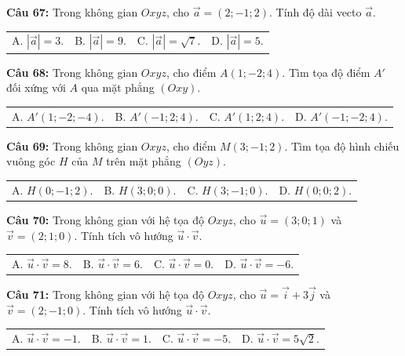 \documentclass[12pt]{article}
\begin{document}
	\vspace{2mm}
	\noindent \textbf{Câu 67:} Trong không gian $Oxyz$, cho $\vec{a} = (2; -1; 2)$. Tính độ dài vecto $\vec{a}$. \\
	\noindent
	\begin{tabular}{p{} p{} p{} p{}}
		A. $|\vec{a}| = 3$. & B. $|\vec{a}| = 9$. & C. $|\vec{a}| = \sqrt{7}$. & D. $|\vec{a}| = 5$.
	\end{tabular}
	
	\vspace{2mm}
	\noindent \textbf{Câu 68:} Trong không gian $Oxyz$, cho điểm $A(1; -2; 4)$. Tìm tọa độ điểm $A'$ đối xứng với $A$ qua mặt phẳng $(Oxy)$. \\
	\noindent
	\begin{tabular}{p{} p{} p{} p{}}
		A. $A'(1; -2; -4)$. & B. $A'(-1; 2; 4)$. & C. $A'(1; 2; 4)$. & D. $A'(-1; -2; 4)$.
	\end{tabular}
	
	\vspace{2mm}
	\noindent \textbf{Câu 69:} Trong không gian $Oxyz$, cho điểm $M(3; -1; 2)$. Tìm tọa độ hình chiếu vuông góc $H$ của $M$ trên mặt phẳng $(Oyz)$. \\
	\noindent
	\begin{tabular}{p{} p{} p{} p{}}
		A. $H(0; -1; 2)$. & B. $H(3; 0; 0)$. & C. $H(3; -1; 0)$. & D. $H(0; 0; 2)$.
	\end{tabular}
	\noindent \textbf{Câu 70:} Trong không gian với hệ tọa độ $Oxyz$, cho $\vec{u} = (3; 0; 1)$ và $\vec{v} = (2; 1; 0)$. Tính tích vô hướng $\vec{u} \cdot \vec{v}$. \\
	\noindent
	\begin{tabular}{p{} p{} p{} p{}}
		A. $\vec{u} \cdot \vec{v} = 8$. & B. $\vec{u} \cdot \vec{v} = 6$. & C. $\vec{u} \cdot \vec{v} = 0$. & D. $\vec{u} \cdot \vec{v} = -6$.
	\end{tabular}
	
	\vspace{2mm}
	\noindent \textbf{Câu 71:} Trong không gian với hệ tọa độ $Oxyz$, cho $\vec{u} = \vec{i} + 3\vec{j}$ và $\vec{v} = (2; -1; 0)$. Tính tích vô hướng $\vec{u} \cdot \vec{v}$. \\
	\noindent
	\begin{tabular}{p{} p{} p{} p{}}
		A. $\vec{u} \cdot \vec{v} = -1$. & B. $\vec{u} \cdot \vec{v} = 1$. & C. $\vec{u} \cdot \vec{v} = -5$. & D. $\vec{u} \cdot \vec{v} = 5\sqrt{2}$.
	\end{tabular}
	
\end{document}
